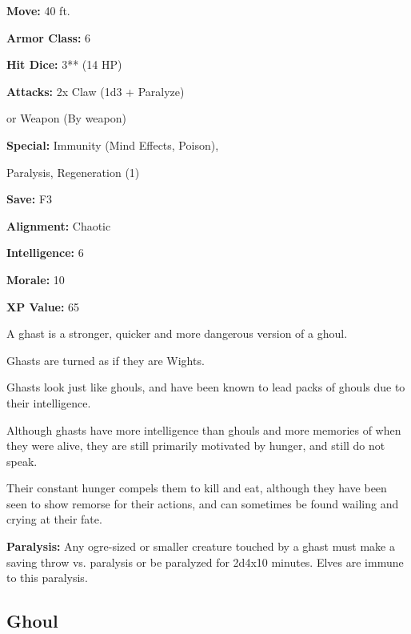 \begin{multicols*}{2}
{\textbf{Move:} 40 ft.

\textbf{Armor Class:} 6

\textbf{Hit Dice:} 3** (14 HP)

\textbf{Attacks:} 2x Claw (1d3 + Paralyze) 

or Weapon (By weapon)

\textbf{Special:} Immunity (Mind Effects, Poison), 

Paralysis, Regeneration (1)

\textbf{Save:} F3

\textbf{Alignment:} Chaotic

\textbf{Intelligence:} 6

\textbf{Morale:} 10

\textbf{XP Value:} 65}

A ghast is a stronger, quicker and more dangerous version of a ghoul. 

Ghasts are turned as if they are Wights.

Ghasts look just like ghouls, and have been known to lead packs of ghouls due to their intelligence.

Although ghasts have more intelligence than ghouls and more memories of when they were alive, they are still primarily motivated by hunger, and still do not speak.

Their constant hunger compels them to kill and eat, although they have been seen to show remorse for their actions, and can sometimes be found wailing and crying at their fate.

\textbf{Paralysis:} Any ogre-sized or smaller creature touched by a ghast must make a saving throw vs. paralysis or be paralyzed for 2d4x10 minutes. Elves are immune to this paralysis.

\subsection{Ghoul}
\end{multicols*}
